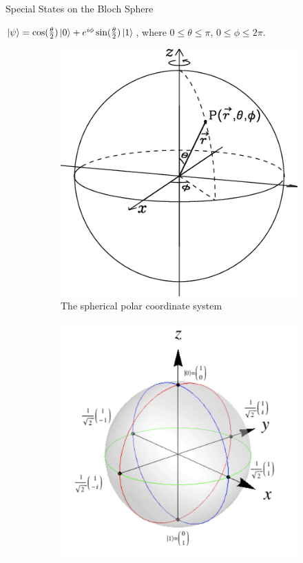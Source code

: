 \documentclass{beamer}
\begin{document}
\begin{frame}{Special States on the Bloch Sphere}
  {\tiny
  $\ket{\psi} = \cos(\frac{\theta}2)\ket{0}+e^{i\phi}\sin(\frac{\theta}2)\ket{1}$, where $0\leqslant\theta\leqslant\pi$, $0\leqslant\phi\leqslant2\pi$.
  \begin{figure}
    \centering
    \begin{subfigure}[b]{0.5\textwidth}
      \centering
      \includegraphics[scale=0.2]{figures/The-spherical-polar-coordinate-system}
      \caption{The spherical polar coordinate system\tiny\cite{sphericalpolarcoordinate}}
    \end{subfigure}
    \hfill
    \begin{subfigure}[b]{0.5\textwidth}
      \centering
      \includegraphics[scale=0.24]{figures/singlequbitstates}

\end{subfigure}
\end{figure}}
\end{frame}
\end{document}
